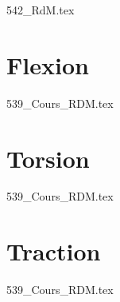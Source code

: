 \setcounter{question}{0}
{}
\graphicspath{{../12-RDM/TD/Deformation/542_RdM/images/}{../12-RDM/TD/Deformation/542_RdM/}{../Style/png/}}
{542_RdM.tex}

\section{Flexion}

\setcounter{question}{0}
{}
\graphicspath{{../12-RDM/TD/Flexion/539_Cours_RDM/images/}{../12-RDM/TD/Flexion/539_Cours_RDM/}{../Style/png/}}
{539_Cours_RDM.tex}

\section{Torsion}

\setcounter{question}{0}
{}
\graphicspath{{../12-RDM/TD/Torsion/539_Cours_RDM/images/}{../12-RDM/TD/Torsion/539_Cours_RDM/}{../Style/png/}}
{539_Cours_RDM.tex}

\section{Traction}

\setcounter{question}{0}
{}
\graphicspath{{../12-RDM/TD/Traction/539_Cours_RDM/images/}{../12-RDM/TD/Traction/539_Cours_RDM/}{../Style/png/}}
{539_Cours_RDM.tex}

